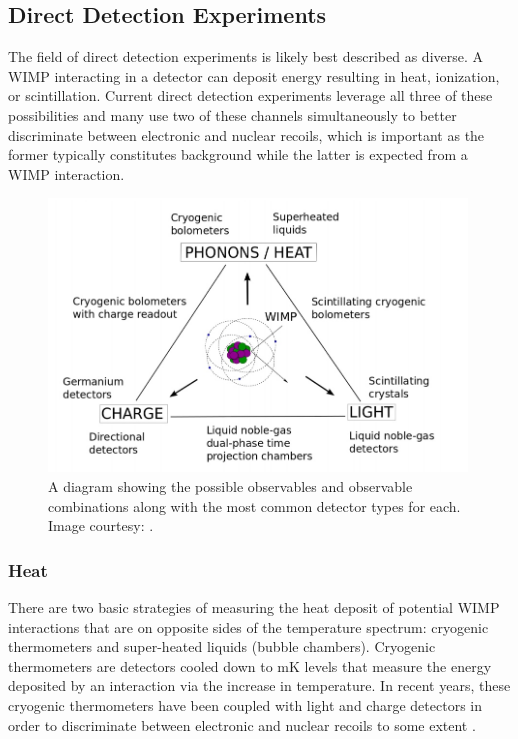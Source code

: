 \subsection{Direct Detection Experiments}

The field of direct detection experiments is likely best described as diverse.  A WIMP interacting in a detector can deposit energy resulting in heat, ionization, or scintillation.  Current direct detection experiments leverage all three of these possibilities and many use two of these channels simultaneously to better discriminate between electronic and nuclear recoils, which is important as the former typically constitutes background while the latter is expected from a WIMP interaction.  

\begin{figure}[t]
	\centering
	\includegraphics[width=0.99\textwidth]{dm_expts_2}
	\caption{A diagram showing the possible observables and observable combinations along with the most common detector types for each.  Image courtesy: \cite{undagoitia2015dark}.}
	\label{fig:dm_expts}
\end{figure}

\subsubsection{Heat}

There are two basic strategies of measuring the heat deposit of potential WIMP interactions that are on opposite sides of the temperature spectrum: cryogenic thermometers and super-heated liquids (bubble chambers).  Cryogenic thermometers are detectors cooled down to mK levels that measure the energy deposited by an interaction via the increase in temperature.  In recent years, these cryogenic thermometers have been coupled with light and charge detectors in order to discriminate between electronic and nuclear recoils to some extent \cite{strauss2016exploring}.  

